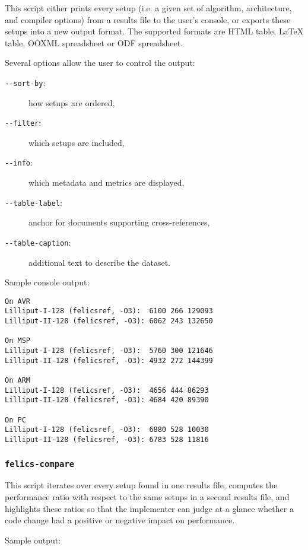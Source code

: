 \documentclass{article}
\begin{document}
This script either prints every setup (i.e. a given set of algorithm,
architecture, and compiler options) from a results file to the user's
console, or exports these setups into a new output format.  The
supported formats are HTML table, \LaTeX{} table, OOXML spreadsheet or
ODF spreadsheet.

Several options allow the user to control the output:

\begin{description}
\item[\texttt{-{}-sort-by}:] how setups are ordered,
\item[\texttt{-{}-filter}:] which setups are included,
\item[\texttt{-{}-info}:] which metadata and metrics are displayed,
\item[\texttt{-{}-table-label}:] anchor for documents supporting
  cross-references,
\item[\texttt{-{}-table-caption}:] additional text to describe the
  dataset.
\end{description}

Sample console output:

\begin{verbatim}
On AVR
Lilliput-I-128 (felicsref, -O3):  6100 266 129093
Lilliput-II-128 (felicsref, -O3): 6062 243 132650

On MSP
Lilliput-I-128 (felicsref, -O3):  5760 300 121646
Lilliput-II-128 (felicsref, -O3): 4932 272 144399

On ARM
Lilliput-I-128 (felicsref, -O3):  4656 444 86293
Lilliput-II-128 (felicsref, -O3): 4684 420 89390

On PC
Lilliput-I-128 (felicsref, -O3):  6880 528 10030
Lilliput-II-128 (felicsref, -O3): 6783 528 11816
\end{verbatim}

\subsubsection{\texttt{felics-compare}}

This script iterates over every setup found in one results file,
computes the performance ratio with respect to the same setups in a
second results file, and highlights these ratios so that the
implementer can judge at a glance whether a code change had a positive
or negative impact on performance.

Sample output:
\end{document}
